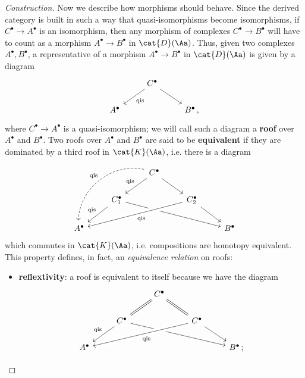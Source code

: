 \begin{thmdef}
\begin{proof}[Construction]
        Now we describe how morphisms should behave.
        Since the derived category is built in such
        a way that quasi-isomorphisms become isomorphisms,
        if $C^{\bullet} \to A^{\bullet}$ is an isomorphism,
        then any morphism of complexes $C^{\bullet} \to B^{\bullet}$
        will have to count as a morphism $A^{\bullet} \to B^{\bullet}$
        in $\cat{D}(\Aa)$. Thus, given two complexes $A^{\bullet}, B^{\bullet}$,
        a representative of a morphism 
        $A^{\bullet} \to B^{\bullet}$ in $\cat{D}(\Aa)$
        is given by a diagram
        \begin{equation*}
            \begin{tikzcd}
                & C^{\bullet} \ar[dl, "\textrm{qis}"] \ar[dr] & \\
                A^{\bullet} & & B^{\bullet}\,,
            \end{tikzcd}
        \end{equation*}
        where $C^{\bullet} \to A^{\bullet}$ is a quasi-isomorphism;
        we will call such a diagram a \textbf{roof} 
        over $A^{\bullet}$ and $B^{\bullet}$.
        Two roofs over $A^{\bullet}$ and $B^{\bullet}$ are
        said to be \textbf{equivalent} if they are 
        dominated by a third roof in $\cat{K}(\Aa)$, 
        i.e. there is a diagram
        \begin{equation*}
            \begin{tikzcd}
                & & C^{\bullet} \arrow[ld, "\textrm{qis}"'] \arrow[rd] 
                \arrow[lldd, "\textrm{qis}"', dashed, bend right=50, shift right] 
                & & \\
                & C_1^{\bullet} \arrow[ld, "\textrm{qis}"'] \arrow[rrrd] 
                & & C_2^{\bullet} \arrow[llld, "\textrm{qis}", crossing over] \arrow[rd] 
                & \\
                A^{\bullet} 
                &  &  &  & B^{\bullet}
            \end{tikzcd}
        \end{equation*}
        which commutes in $\cat{K}(\Aa)$, i.e. compositions are homotopy equivalent.
        This property defines, in fact, an \emph{equivalence relation} on roofs:
        \begin{itemize}
            \item \textbf{reflextivity}: a roof is equivalent to itself because
            we have the diagram
            \begin{equation*}
            \begin{tikzcd}
                & & C^{\bullet} \arrow[ld, equals] \arrow[rd, equals] 
                & & \\
                & C^{\bullet} \arrow[ld, "\textrm{qis}"'] \arrow[rrrd] 
                & & C^{\bullet} \arrow[llld, "\textrm{qis}", crossing over] \arrow[rd] 
                & \\
                A^{\bullet} 
                &  &  &  & B^{\bullet}\,;
            \end{tikzcd}
            \end{equation*}


\end{itemize}
\end{proof}
\end{thmdef}
